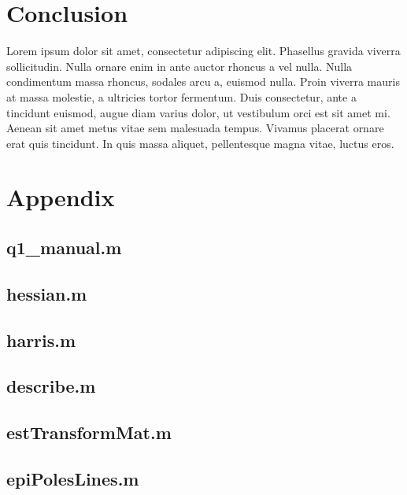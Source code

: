 \documentclass[a4paper, 10pt, conference]{ieeeconf}
\begin{document}
\section{Conclusion}
Lorem ipsum dolor sit amet, consectetur adipiscing elit. Phasellus gravida viverra sollicitudin. Nulla ornare enim in ante auctor rhoncus a vel nulla. Nulla condimentum massa rhoncus, sodales arcu a, euismod nulla. Proin viverra mauris at massa molestie, a ultricies tortor fermentum. Duis consectetur, ante a tincidunt euismod, augue diam varius dolor, ut vestibulum orci est sit amet mi. Aenean sit amet metus vitae sem malesuada tempus. Vivamus placerat ornare erat quis tincidunt. In quis massa aliquet, pellentesque magna vitae, luctus eros.




\onecolumn
\section*{Appendix}

\subsection*{q1\_manual.m}

\newpage

\subsection*{hessian.m}

\newpage

\subsection*{harris.m}

\newpage

\subsection*{describe.m}

\newpage

\subsection*{estTransformMat.m}

\newpage

\subsection*{epiPolesLines.m}

\newpage
\end{document}
